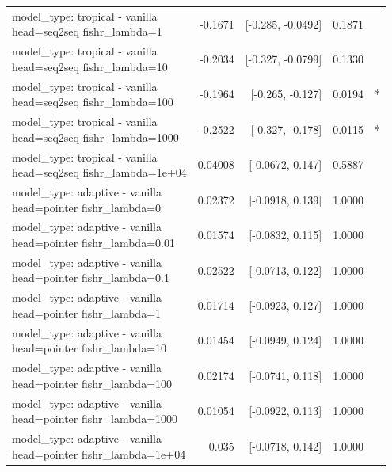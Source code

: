\documentclass[10pt]{article}
\makeatletter
\newcommand{\stackcell}[1]{\begin{tabular}[t]{@{}l@{}}#1\end{tabular}}
\makeatother
\begin{document}
{\begin{longtable}{lrrrl}
\stackcell{model\_type: tropical - vanilla\\\footnotesize head=seq2seq fishr\_lambda=1 } & -0.1671 & [-0.285, -0.0492] & 0.1871 & \\
\stackcell{model\_type: tropical - vanilla\\\footnotesize head=seq2seq fishr\_lambda=10 } & -0.2034 & [-0.327, -0.0799] & 0.1330 & \\
\stackcell{model\_type: tropical - vanilla\\\footnotesize head=seq2seq fishr\_lambda=100 } & -0.1964 & [-0.265, -0.127] & 0.0194 & *\\
\stackcell{model\_type: tropical - vanilla\\\footnotesize head=seq2seq fishr\_lambda=1000 } & -0.2522 & [-0.327, -0.178] & 0.0115 & *\\
\stackcell{model\_type: tropical - vanilla\\\footnotesize head=seq2seq fishr\_lambda=1e+04 } & 0.04008 & [-0.0672, 0.147] & 0.5887 & \\
\stackcell{model\_type: adaptive - vanilla\\\footnotesize head=pointer fishr\_lambda=0 } & 0.02372 & [-0.0918, 0.139] & 1.0000 & \\
\stackcell{model\_type: adaptive - vanilla\\\footnotesize head=pointer fishr\_lambda=0.01 } & 0.01574 & [-0.0832, 0.115] & 1.0000 & \\
\stackcell{model\_type: adaptive - vanilla\\\footnotesize head=pointer fishr\_lambda=0.1 } & 0.02522 & [-0.0713, 0.122] & 1.0000 & \\
\stackcell{model\_type: adaptive - vanilla\\\footnotesize head=pointer fishr\_lambda=1 } & 0.01714 & [-0.0923, 0.127] & 1.0000 & \\
\stackcell{model\_type: adaptive - vanilla\\\footnotesize head=pointer fishr\_lambda=10 } & 0.01454 & [-0.0949, 0.124] & 1.0000 & \\
\stackcell{model\_type: adaptive - vanilla\\\footnotesize head=pointer fishr\_lambda=100 } & 0.02174 & [-0.0741, 0.118] & 1.0000 & \\
\stackcell{model\_type: adaptive - vanilla\\\footnotesize head=pointer fishr\_lambda=1000 } & 0.01054 & [-0.0922, 0.113] & 1.0000 & \\
\stackcell{model\_type: adaptive - vanilla\\\footnotesize head=pointer fishr\_lambda=1e+04 } & 0.035 & [-0.0718, 0.142] & 1.0000 & \\

\end{longtable}}
\end{document}
